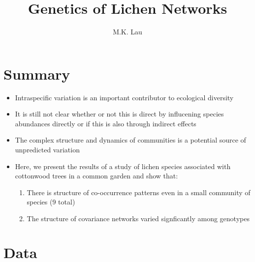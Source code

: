\documentclass[12pt]{article}
\title{Genetics of Lichen Networks}
\author{M.K. Lau}
\begin{document}
\maketitle


\setcounter{tocdepth}{3}
\tableofcontents

\section{Summary}
\begin{itemize}
\item Intraspecific variation is an important contributor to
  ecological diversity
\item It is still not clear whether or not this is direct by
  influcening species abundances directly or if this is also through
  indirect effects
\item The complex structure and dynamics of communities is a potential
  source of unpredicted variation
\item Here, we present the results of a study of lichen species
  associated with cottonwood trees in a common garden and show that:
  \begin{enumerate}
  \item There is structure of co-occurrence patterns even in a small
    community of species (9 total)
  \item The structure of covariance networks varied signficantly among
    genotypes
  \end{enumerate}
\end{itemize}

\section{Data}
\end{document}
